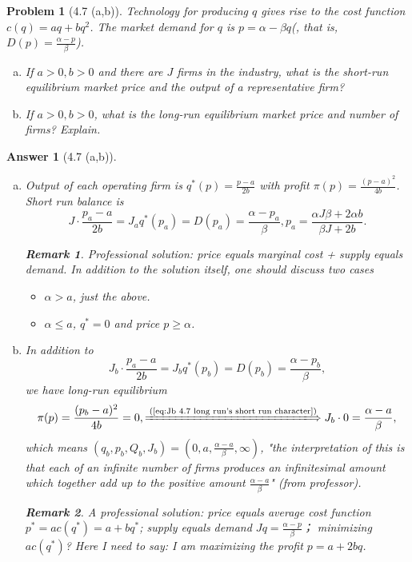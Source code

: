 \documentclass{article}
\newtheorem*{ans}{Answer}
\newtheorem*{prob}{{\bf Problem}}
\newtheorem{rem}{\bf Remark}
\newcommand{\1}{{\bf 1}}
\newcommand{\0}{{\mathbf{0}}}
\newcommand{\<}{\langle}
\renewcommand{\>}{\rangle}
\begin{document}
\begin{prob}[4.7 (a,b)] Technology for producing $q$ gives rise to the cost function $c(q) = aq+bq^2$. The market demand for $q$ is $p = \alpha - \beta q$(, that is, $D(p) = \frac{\alpha - p}{\beta}$).
	\begin{enumerate}[(a)]
		\item If $a>0,b > 0$ and there are $J $ firms in the industry, what is the short-run equilibrium market price and the output of a representative firm?
		\item If $a>0, b > 0$, what is the long-run equilibrium market price and number of firms? Explain.
	\end{enumerate}
\end{prob}
\begin{ans}[4.7 (a,b)] \begin{enumerate}[(a)]
		\item Output of each operating firm is $q^*(p) = \frac{p - a }{2 b }$ with profit $\pi(p) = \frac{(p-a)^2}{ 4b } $. Short run balance is 
		\begin{equation} J\cdot \frac{p_a - a }{2 b } = J_a q^*(p_a) = D(p_a) = \frac{\alpha - p_a}{\beta} , p_a = \frac{\alpha J\beta + 2 \alpha b}{\beta J + 2 b}.
			\end{equation}
	
		
		\begin{rem}
			Professional solution: price equals  marginal cost + supply equals demand. In addition to the solution itself, one should discuss two cases
			\begin{itemize}
				\item $
				\alpha > a $, just the above. 
				\item $\alpha \le a$, $q^* =0$ and price $p  \ge \alpha $.
			\end{itemize}
		\end{rem}
		\item In addition to 
		\begin{equation}
		J_b \cdot \frac{p_a - a }{2 b } = J_b q^*(p_b) = D(p_b ) = \frac{\alpha - p_b }{\beta}, \label{eq:Jb 4.7 long run's short run character}
		\end{equation}
		we have long-run equilibrium
		\begin{equation}
		\pi(p) = \frac{(p_b-a)^2}{ 4b } = 0,\xLongrightarrow{\text{(\ref{eq:Jb 4.7 long run's short run character})}} J_b \cdot 0 =  \frac{\alpha - a }{\beta},
		\end{equation}
		which means $\left( q_b, p_b , Q_b, J_b  \right) = \left( 0, a, \frac{\alpha - a }{\beta}, \infty\right)$, "the interpretation of this is that each of an infinite number of firms produces an infinitesimal amount which together add up to the positive amount $\frac{\alpha - a }{\beta }$" (from professor).
		\begin{rem}
			A professional solution: price equals average cost function $ p^* =ac(q^*) = a + bq^*$; supply equals demand $Jq = \frac{\alpha - p}\beta$；  minimizing $ac(q^*)$? Here I need to say: I am maximizing the profit $ p  = a+2bq$.
			

\end{rem}
\end{enumerate}
\end{ans}
\end{document}
